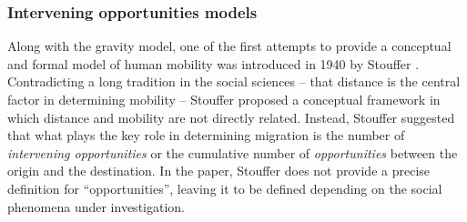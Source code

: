 \subsubsection{Intervening opportunities models}
\label{sec:Intervening}

Along with the gravity model, one of the first attempts to provide a conceptual and formal model of human mobility was introduced in 1940 by Stouffer \cite{stouffer_1940_intervening}. Contradicting a long tradition in the social sciences -- that distance is the central factor in determining mobility -- Stouffer proposed a conceptual framework in which distance and mobility are not directly related. Instead, Stouffer suggested that what plays the key role in determining migration is the number of \emph{intervening opportunities} or the cumulative number of \emph{opportunities} between the origin and the destination. In the paper, Stouffer does not provide a precise definition for ``opportunities'', leaving it to be defined depending on the social phenomena under investigation.

